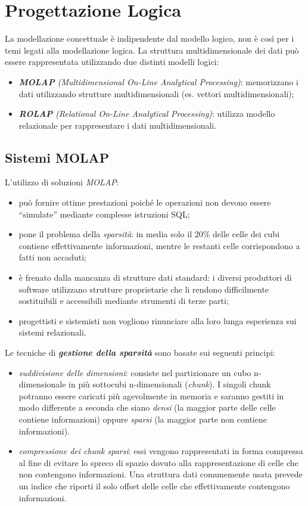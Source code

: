 \documentclass[a4paper, notitlepage, 9pt]{extreport}
\begin{document}
\section*{Progettazione Logica}
La modellazione concettuale è indipendente dal modello logico, non è così per i temi legati alla modellazione logica. La struttura multidimensionale dei dati può essere rappresentata utilizzando due distinti modelli logici:
\begin{itemize}
	\item \textit{\textbf{MOLAP} (Multidimensional On-Line Analytical Processing)}: memorizzano i dati utilizzando strutture multidimensionali (es. vettori multidimensionali);
	\item \textit{\textbf{ROLAP} (Relational On-Line Analytical Processing)}: utilizza modello relazionale per rappresentare i dati multidimensionali.
\end{itemize}

\subsection*{Sistemi MOLAP}
L'utilizzo di soluzioni \textit{MOLAP}:
\begin{itemize}
	\item può fornire ottime prestazioni poiché le operazioni non devono essere “simulate” mediante complesse istruzioni SQL; 
	\item pone il problema della \textit{sparsità}: in media solo il $20\%$ delle celle dei cubi contiene effettivamente informazioni, mentre le restanti celle corrispondono a fatti non accaduti;
	\item è frenato dalla mancanza di strutture dati standard: i diversi produttori di software utilizzano strutture proprietarie che li rendono difficilmente sostituibili e accessibili mediante strumenti di terze parti;
	\item progettisti e sistemisti non vogliono rinunciare alla loro lunga esperienza sui sistemi relazionali.
\end{itemize}
Le tecniche di \textit{\textbf{gestione della sparsità}} sono basate sui seguenti principi:
\begin{itemize}
	\item \textit{suddivisione delle dimensioni}: consiste nel partizionare un cubo n-dimensionale in più sottocubi n-dimensionali (\textit{chunk}). I singoli chunk potranno essere caricati più agevolmente in memoria e saranno gestiti in modo differente a seconda che siano \textit{densi} (la maggior parte delle celle contiene informazioni) oppure \textit{sparsi} (la maggior parte non contiene informazioni).
	\item \textit{compressione dei chunk sparsi}: essi vengono rappresentati in forma compressa al fine di evitare lo spreco di spazio dovuto alla rappresentazione di celle che non contengono informazioni. Una struttura dati comunemente usata prevede un indice che riporti il solo offset delle celle che effettivamente contengono informazioni.
\end{itemize}
\end{document}
